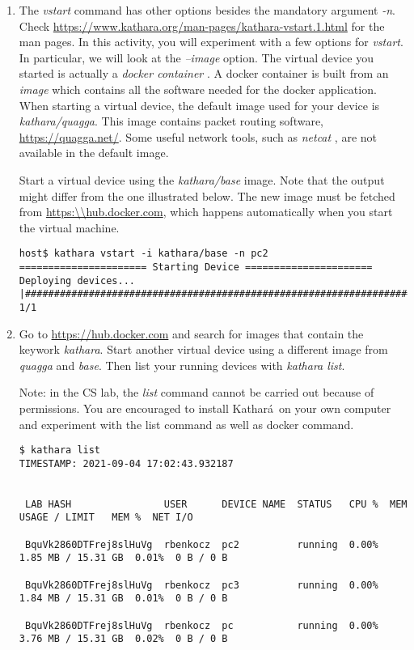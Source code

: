 \documentclass[12pt]{book}
\newcommand{\kathara}{Kathar\'a}
\begin{document}
\begin{enumerate}[resume*]
\item The \emph{vstart} command has other options besides the mandatory argument \emph{-n}. Check \url{https://www.kathara.org/man-pages/kathara-vstart.1.html} for the man pages. In this activity, you will experiment with a few options for \emph{vstart}. In particular, we will look at the \emph{--image} option. The virtual device you started is actually a \emph{docker container} \cite{docker-useful}. A docker container is built from an \emph{image} which contains all the software needed for the docker application. When starting a virtual device, the default image used for your device is \emph{kathara/quagga}. This image contains packet routing software, \url{https://quagga.net/}. Some useful network tools, such as \emph{netcat} \cite{netcat}, are not available in the default image.

  Start a virtual device using the \emph{kathara/base} image. Note that the output might differ from the one illustrated below. The new image must be fetched from \url{https:\\hub.docker.com}, which happens automatically when you start the virtual machine.

\begin{lstlisting}
host$ kathara vstart -i kathara/base -n pc2
====================== Starting Device ======================
Deploying devices... |#######################################################################################| 1/1
\end{lstlisting}

\item Go to \url{https://hub.docker.com} and search for images that contain the keywork \emph{kathara}. Start another virtual device using a different image from \emph{quagga} and \emph{base}. Then list your running devices with \emph{kathara list}.

  Note: in the CS lab, the \emph{list} command cannot be carried out because of permissions. You are encouraged to install \kathara\ on your own computer and experiment with the list command as well as docker command.

\begin{lstlisting}
$ kathara list
TIMESTAMP: 2021-09-04 17:02:43.932187


 LAB HASH                USER      DEVICE NAME  STATUS   CPU %  MEM USAGE / LIMIT   MEM %  NET I/O   

 BquVk2860DTFrej8slHuVg  rbenkocz  pc2          running  0.00%  1.85 MB / 15.31 GB  0.01%  0 B / 0 B 

 BquVk2860DTFrej8slHuVg  rbenkocz  pc3          running  0.00%  1.84 MB / 15.31 GB  0.01%  0 B / 0 B 

 BquVk2860DTFrej8slHuVg  rbenkocz  pc           running  0.00%  3.76 MB / 15.31 GB  0.02%  0 B / 0 B 

\end{lstlisting}

\end{enumerate}
\end{document}
